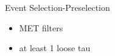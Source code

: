 \documentclass{beamer}
\begin{document}
\begin{frame}{Event Selection-Preselection}
    \begin{itemize}
    \item
        MET filters
    \item
        at least 1 loose tau
    \end{itemize}
\end{frame}


\end{document}
